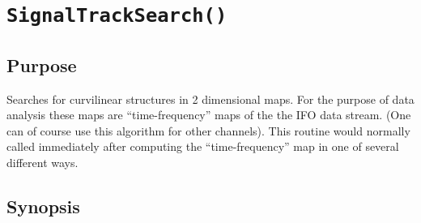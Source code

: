 
\section{\tt SignalTrackSearch()}

\subsection{Purpose}
Searches for curvilinear structures in 2 dimensional maps. For the
purpose of data analysis these maps are ``time-frequency'' maps of the 
the IFO data stream. (One can of course use this algorithm for other
channels). This routine would normally called immediately after
computing the ``time-frequency'' map in one of several different ways.

\subsection{Synopsis}

